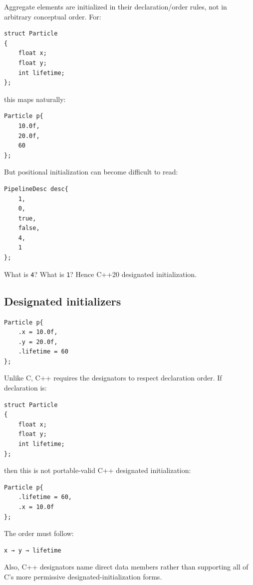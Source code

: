 Aggregate elements are initialized in their declaration/order rules, not in arbitrary conceptual order. For:

\begin{verbatim}
struct Particle
{
    float x;
    float y;
    int lifetime;
};
\end{verbatim}

this maps naturally:

\begin{verbatim}
Particle p{
    10.0f,
    20.0f,
    60
};
\end{verbatim}

But positional initialization can become difficult to read:

\begin{verbatim}
PipelineDesc desc{
    1,
    0,
    true,
    false,
    4,
    1
};
\end{verbatim}

What is \texttt{4}? What is \texttt{1}? Hence C++20 designated initialization.

\subsection{Designated initializers}\label{01-foundations-i-ch003-designated-initializers}

\begin{verbatim}
Particle p{
    .x = 10.0f,
    .y = 20.0f,
    .lifetime = 60
};
\end{verbatim}

Unlike C, C++ requires the designators to respect declaration order. If declaration is:

\begin{verbatim}
struct Particle
{
    float x;
    float y;
    int lifetime;
};
\end{verbatim}

then this is not portable-valid C++ designated initialization:

\begin{verbatim}
Particle p{
    .lifetime = 60,
    .x = 10.0f
};
\end{verbatim}

The order must follow:

\begin{verbatim}
x → y → lifetime
\end{verbatim}

Also, C++ designators name direct data members rather than supporting all of C's more permissive designated-initialization forms.


